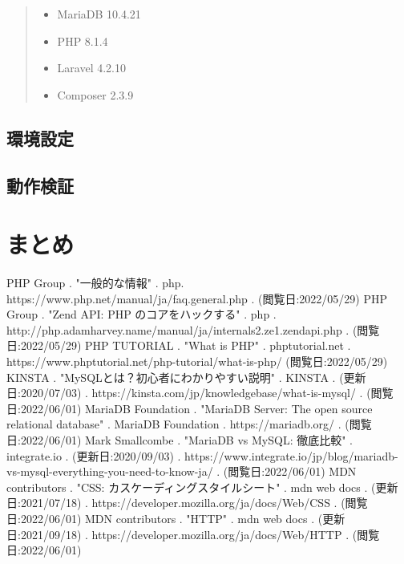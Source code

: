 \documentclass[submit,techrep]{ipsj}
\begin{document}
\begin{quote}
 \begin{itemize}
 \item MariaDB 10.4.21
 \item PHP 8.1.4
 \item Laravel 4.2.10
 \item Composer 2.3.9
 \end{itemize}
\end{quote}

\subsection{環境設定}

\subsection{動作検証}

\section{まとめ}




\begin{thebibliography}{9}
 PHP Group . "一般的な情報" . php. https://www.php.net/manual/ja/faq.general.php . (閲覧日:2022/05/29)
 PHP Group . "Zend API: PHP のコアをハックする" . php . http://php.adamharvey.name/manual/ja/internals2.ze1.zendapi.php . (閲覧日:2022/05/29)
 PHP TUTORIAL . "What is PHP" . phptutorial.net . https://www.phptutorial.net/php-tutorial/what-is-php/ (閲覧日:2022/05/29)
 KINSTA . "MySQLとは？初心者にわかりやすい説明" . KINSTA . (更新日:2020/07/03) . https://kinsta.com/jp/knowledgebase/what-is-mysql/ . (閲覧日:2022/06/01)
 MariaDB Foundation . "MariaDB Server: The open source relational database" . MariaDB Foundation . https://mariadb.org/ . (閲覧日:2022/06/01)
 Mark Smallcombe . "MariaDB vs MySQL: 徹底比較" . integrate.io . (更新日:2020/09/03) . https://www.integrate.io/jp/blog/mariadb-vs-mysql-everything-you-need-to-know-ja/ . (閲覧日:2022/06/01)
 MDN contributors . "CSS: カスケーディングスタイルシート" . mdn web docs . (更新日:2021/07/18) . https://developer.mozilla.org/ja/docs/Web/CSS . (閲覧日:2022/06/01)
 MDN contributors . "HTTP" . mdn web docs . (更新日:2021/09/18) . https://developer.mozilla.org/ja/docs/Web/HTTP . (閲覧日:2022/06/01)
\end{thebibliography}
\end{document}
